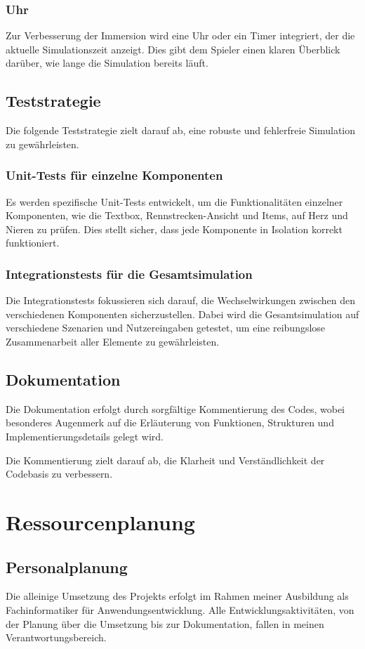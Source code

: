 \documentclass[hidelinks,12pt]{article}
\begin{document}
\subsubsection{Uhr}
Zur Verbesserung der Immersion wird eine Uhr oder ein Timer integriert, der die aktuelle Simulationszeit anzeigt. Dies gibt dem Spieler einen klaren Überblick darüber, wie lange die Simulation bereits läuft.

\subsection{Teststrategie}
Die folgende Teststrategie zielt darauf ab, eine robuste und fehlerfreie Simulation zu gewährleisten.

\subsubsection{Unit-Tests für einzelne Komponenten}
Es werden spezifische Unit-Tests entwickelt, um die Funktionalitäten einzelner Komponenten, wie die Textbox, Rennstrecken-Ansicht und Items, auf Herz und Nieren zu prüfen. Dies stellt sicher, dass jede Komponente in Isolation korrekt funktioniert.

\subsubsection{Integrationstests für die Gesamtsimulation}
Die Integrationstests fokussieren sich darauf, die Wechselwirkungen zwischen den verschiedenen Komponenten sicherzustellen. Dabei wird die Gesamtsimulation auf verschiedene Szenarien und Nutzereingaben getestet, um eine reibungslose Zusammenarbeit aller Elemente zu gewährleisten.

\subsection{Dokumentation}
Die Dokumentation erfolgt durch sorgfältige Kommentierung des Codes, wobei besonderes Augenmerk auf die Erläuterung von Funktionen, Strukturen und Implementierungsdetails gelegt wird.

Die Kommentierung zielt darauf ab, die Klarheit und Verständlichkeit der Codebasis zu verbessern.

\section{Ressourcenplanung}

\subsection{Personalplanung}
Die alleinige Umsetzung des Projekts erfolgt im Rahmen meiner Ausbildung als Fachinformatiker für Anwendungsentwicklung. Alle Entwicklungsaktivitäten, von der Planung über die Umsetzung bis zur Dokumentation, fallen in meinen Verantwortungsbereich.
\end{document}
